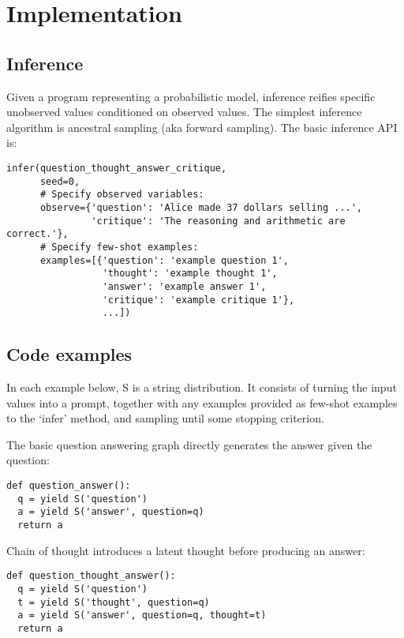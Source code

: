 \section{Implementation}
\label{app:implementation}


\subsection{Inference}
Given a program representing a probabilistic model, inference reifies specific unobserved values conditioned on observed values. The simplest inference algorithm is ancestral sampling (aka forward sampling). The basic inference API is:

\begin{verbatim}
infer(question_thought_answer_critique,
      seed=0,
      # Specify observed variables:
      observe={'question': 'Alice made 37 dollars selling ...',
               'critique': 'The reasoning and arithmetic are correct.'},
      # Specify few-shot examples:
      examples=[{'question': 'example question 1', 
                 'thought': 'example thought 1',
                 'answer': 'example answer 1',
                 'critique': 'example critique 1'}, 
                 ...])
\end{verbatim}

\subsection{Code examples}

In each example below, S is a string distribution. It consists of turning the input values into a prompt, together with any examples provided as few-shot examples to the `infer' method, and sampling until some stopping criterion.

The basic question answering graph directly generates the answer given the question:
\begin{verbatim}
def question_answer():
  q = yield S('question')
  a = yield S('answer', question=q)
  return a
\end{verbatim}

Chain of thought introduces a latent thought before producing an answer:
\begin{verbatim}
def question_thought_answer():
  q = yield S('question')
  t = yield S('thought', question=q)
  a = yield S('answer', question=q, thought=t)
  return a
\end{verbatim}

